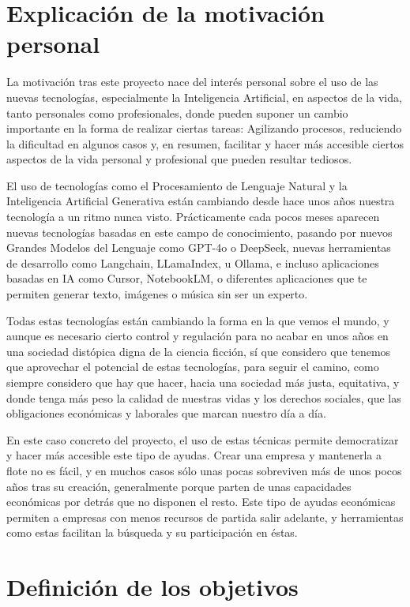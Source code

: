 \section{Explicación de la motivación personal}

La motivación tras este proyecto nace del interés personal sobre el uso de las nuevas tecnologías, especialmente la Inteligencia Artificial, en aspectos de la vida, tanto personales como profesionales, donde pueden suponer un cambio importante en la forma de realizar ciertas tareas: Agilizando procesos, reduciendo la dificultad en algunos casos y, en resumen, facilitar y hacer más accesible ciertos aspectos de la vida personal y profesional que pueden resultar tediosos.

El uso de tecnologías como el Procesamiento de Lenguaje Natural y la Inteligencia Artificial Generativa están cambiando desde hace unos años nuestra tecnología a un ritmo nunca visto. Prácticamente cada pocos meses aparecen nuevas tecnologías basadas en este campo de conocimiento, pasando por nuevos Grandes Modelos del Lenguaje como GPT-4o o DeepSeek, nuevas herramientas de desarrollo como Langchain, LLamaIndex, u Ollama, e incluso aplicaciones basadas en IA como Cursor, NotebookLM, o diferentes aplicaciones que te permiten generar texto, imágenes o música sin ser un experto.

Todas estas tecnologías están cambiando la forma en la que vemos el mundo, y aunque es necesario cierto control y regulación para no acabar en unos años en una sociedad distópica digna de la ciencia ficción, sí que considero que tenemos que aprovechar el potencial de estas tecnologías, para seguir el camino, como siempre considero que hay que hacer, hacia una sociedad más justa, equitativa, y donde tenga más peso la calidad de nuestras vidas y los derechos sociales, que las obligaciones económicas y laborales que marcan nuestro día a día.

En este caso concreto del proyecto, el uso de estas técnicas permite democratizar y hacer más accesible este tipo de ayudas. Crear una empresa y mantenerla a flote no es fácil, y en muchos casos sólo unas pocas sobreviven más de unos pocos años tras su creación, generalmente porque parten de unas capacidades económicas por detrás que no disponen el resto. Este tipo de ayudas económicas permiten a empresas con menos recursos de partida salir adelante, y herramientas como estas facilitan la búsqueda y su participación en éstas.

\newpage

\section{Definición de los objetivos}


